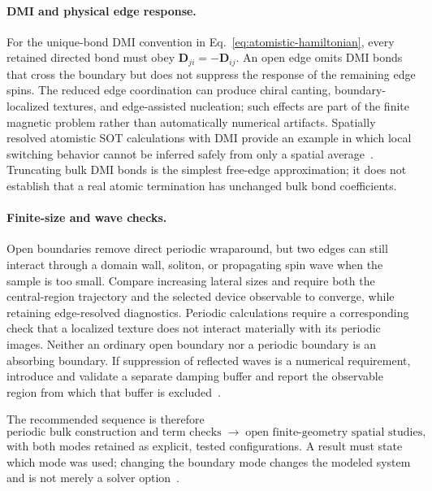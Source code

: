 \paragraph{DMI and physical edge response.}
For the unique-bond DMI convention in
Eq.~\eqref{eq:atomistic-hamiltonian}, every retained directed bond must obey
$\mathbf D_{ji}=-\mathbf D_{ij}$.  An open edge omits DMI bonds that cross
the boundary but does not suppress the response of the remaining edge
spins.  The reduced edge coordination can produce chiral canting,
boundary-localized textures, and edge-assisted nucleation; such effects are
part of the finite magnetic problem rather than automatically numerical
artifacts.  Spatially resolved atomistic SOT calculations with DMI provide
an example in which local switching behavior cannot be inferred safely from
only a spatial average~\cite{kong2026spatially}.  Truncating bulk DMI bonds is
the simplest free-edge approximation; it does not establish that a real
atomic termination has unchanged bulk bond coefficients.

\paragraph{Finite-size and wave checks.}
Open boundaries remove direct periodic wraparound, but two edges can still
interact through a domain wall, soliton, or propagating spin wave when the
sample is too small.  Compare increasing lateral sizes and require both the
central-region trajectory and the selected device observable to converge,
while retaining edge-resolved diagnostics.  Periodic calculations require a
corresponding check that a localized texture does not interact materially
with its periodic images.  Neither an ordinary open boundary nor a periodic
boundary is an absorbing boundary.  If suppression of reflected waves is a
numerical requirement, introduce and validate a separate damping buffer and
report the observable region from which that buffer is
excluded~\cite{zhu2020terahertz,astro-code}.

The recommended sequence is therefore
\begin{equation}
    \text{periodic bulk construction and term checks}
    \;\longrightarrow\;
    \text{open finite-geometry spatial studies},
    \label{eq:atomistic-boundary-workflow}
\end{equation}
with both modes retained as explicit, tested configurations.  A result must
state which mode was used; changing the boundary mode changes the modeled
system and is not merely a solver
option~\cite{astro-code,kong2026spatially}.
